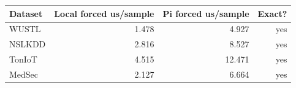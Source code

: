 \begin{tabular}{lrrr}
\toprule
Dataset & Local forced us/sample & Pi forced us/sample & Exact? \\
\midrule
WUSTL & 1.478 & 4.927 & yes \\
NSLKDD & 2.816 & 8.527 & yes \\
TonIoT & 4.515 & 12.471 & yes \\
MedSec & 2.127 & 6.664 & yes \\
\bottomrule
\end{tabular}
